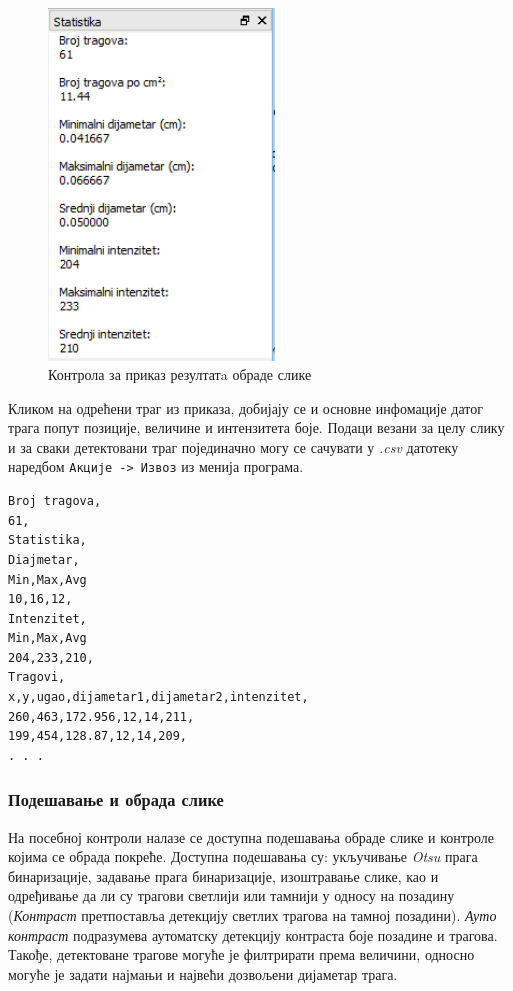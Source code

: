 \documentclass[11pt,a4paper,serbian,oneside]{book}
\begin{document}
\begin{figure}[H]
\begin{center}
\includegraphics[width=60mm]{images/stats.png}
\end{center}
\caption{Контрола за приказ резултатa обраде слике}
\label{fig:stats}
\end{figure}

Кликом на одрећени траг из приказа, добијају се и основне инфомације датог трага попут позиције, величине и интензитета боје. Подаци везани за целу слику и за сваки детектовани траг појединачно могу се сачувати у \textit{.csv} датотеку наредбом \texttt{Акције -> Извоз} из менија програма. 

\begin{lstlisting}[language=Xml,label=lst:stats,caption=Пример сачуваних резултата]
Broj tragova,
61,
Statistika,
Diajmetar,
Min,Max,Avg
10,16,12,
Intenzitet,
Min,Max,Avg
204,233,210,
Tragovi,
x,y,ugao,dijametar1,dijametar2,intenzitet,
260,463,172.956,12,14,211,
199,454,128.87,12,14,209,
. . .
\end{lstlisting}

\subsubsection{Подешавање и обрада слике}

На посебној контроли налазе се доступна подешавања обраде слике и контроле којима се обрада покреће.
Доступна подешавања су: укључивање \textit{Otsu} прага бинаризације, задавање прага бинаризације, изоштравање слике, као и одређивање да ли су трагови светлији или тамнији у односу на позадину (\textit{Контраст} претпоставља детекцију светлих трагова на тамној позадини). \textit{Ауто контраст} подразумева аутоматску детекцију контраста боје позадине и трагова. Такође, детектоване трагове могуће је филтрирати према величини, односно могуће је задати најмањи и највећи дозвољени дијаметар трага. 
\end{document}
